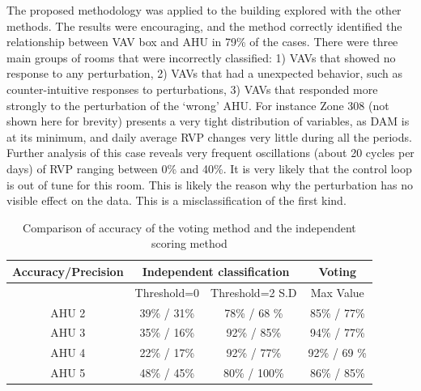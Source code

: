The proposed methodology was applied to the building explored with the other methods. The results were encouraging, and the method correctly identified the relationship between VAV box and AHU in 79\% of the cases. There were three main groups of rooms that were incorrectly classified: 1) VAVs that showed no response to any perturbation, 2) VAVs that had a unexpected behavior, such as counter-intuitive responses to perturbations, 3) VAVs that responded more strongly to the perturbation of the ‘wrong’ AHU.
For instance Zone 308 (not shown here for brevity) presents a very tight distribution of variables, as DAM is at its minimum, and daily average RVP changes very little during all the periods. Further analysis of this case reveals very frequent oscillations (about 20 cycles per days) of RVP ranging between 0\% and 40\%. It is very likely that the control loop is out of tune for this room. This is likely the reason why the perturbation has no visible effect on the data. This is a misclassification of the first kind.

\begin{table}[ht]\scriptsize
 \caption{ Comparison of accuracy of the voting method and the independent scoring method}
 \label{tab:results}
\begin{tabular*}{0.40\textwidth}{|c|c|c|c|}
\hline
Accuracy/Precision & \multicolumn{2}{|c|}{Independent classification} & Voting \\ \hline
& Threshold=0 & Threshold=2 S.D & Max Value  \\ \hline
AHU 2 &	39\% / 31\% &	78\% / 68 \% &	85\% / 77\% \\
AHU 3 &	35\% / 16\% &	92\% / 85\% &	94\% / 77\% \\
AHU 4 &	22\% / 17\% &	92\% / 77\% &	92\% / 69 \% \\
AHU 5 &	48\% / 45\% &	80\% / 100\% &	86\% / 85\% \\ \hline
\end{tabular*}
\end{table}



